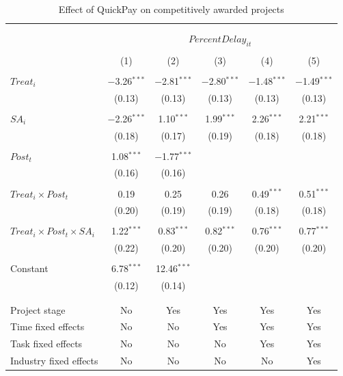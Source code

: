 \documentclass[
]{article}
\begin{document}
\begin{table}[H] \centering 
  \caption{Effect of QuickPay on competitively awarded projects} 
  \label{} 
\small 
\begin{tabular}{@{\extracolsep{-2pt}}lccccc} 
\\[-1.8ex]\hline 
\hline \\[-1.8ex] 
\\[-1.8ex] & \multicolumn{5}{c}{$PercentDelay_{it}$  } \\ 
\\[-1.8ex] & (1) & (2) & (3) & (4) & (5)\\ 
\hline \\[-1.8ex] 
 $Treat_i$ & $-$3.26$^{***}$ & $-$2.81$^{***}$ & $-$2.80$^{***}$ & $-$1.48$^{***}$ & $-$1.49$^{***}$ \\ 
  & (0.13) & (0.13) & (0.13) & (0.13) & (0.13) \\ 
  & & & & & \\ 
 $SA_i$ & $-$2.26$^{***}$ & 1.10$^{***}$ & 1.99$^{***}$ & 2.26$^{***}$ & 2.21$^{***}$ \\ 
  & (0.18) & (0.17) & (0.19) & (0.18) & (0.18) \\ 
  & & & & & \\ 
 $Post_t$ & 1.08$^{***}$ & $-$1.77$^{***}$ &  &  &  \\ 
  & (0.16) & (0.16) &  &  &  \\ 
  & & & & & \\ 
 $Treat_i \times Post_t$ & 0.19 & 0.25 & 0.26 & 0.49$^{***}$ & 0.51$^{***}$ \\ 
  & (0.20) & (0.19) & (0.19) & (0.18) & (0.18) \\ 
  & & & & & \\ 
 $Treat_i \times Post_t \times SA_i $ & 1.22$^{***}$ & 0.83$^{***}$ & 0.82$^{***}$ & 0.76$^{***}$ & 0.77$^{***}$ \\ 
  & (0.22) & (0.20) & (0.20) & (0.20) & (0.20) \\ 
  & & & & & \\ 
 Constant & 6.78$^{***}$ & 12.46$^{***}$ &  &  &  \\ 
  & (0.12) & (0.14) &  &  &  \\ 
  & & & & & \\ 
\hline \\[-1.8ex] 
Project stage & No & Yes & Yes & Yes & Yes \\ 
Time fixed effects & No & No & Yes & Yes & Yes \\ 
Task fixed effects & No & No & No & Yes & Yes \\ 
Industry fixed effects & No & No & No & No & Yes \\ 

\end{tabular}
\end{table}
\end{document}
